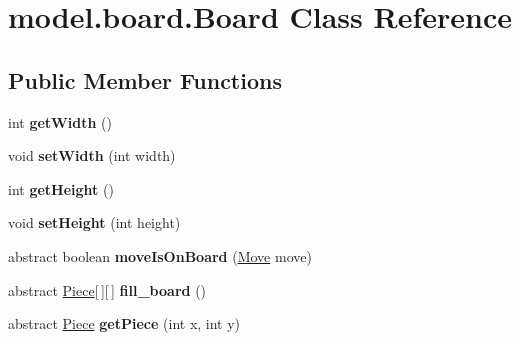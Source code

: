 \hypertarget{classmodel_1_1board_1_1_board}{\section{model.\-board.\-Board Class Reference}
\label{classmodel_1_1board_1_1_board}
}
\subsection*{Public Member Functions}
\begin{DoxyCompactItemize}
\item 
\hypertarget{classmodel_1_1board_1_1_board_ae49d2dd17586c9487302e3d072606011}{int {\bfseries get\-Width} ()}\label{classmodel_1_1board_1_1_board_ae49d2dd17586c9487302e3d072606011}

\item 
\hypertarget{classmodel_1_1board_1_1_board_ae74beaedbf44d6c618d917e0e8a16399}{void {\bfseries set\-Width} (int width)}\label{classmodel_1_1board_1_1_board_ae74beaedbf44d6c618d917e0e8a16399}

\item 
\hypertarget{classmodel_1_1board_1_1_board_a186f90661074eca42ab9bb9b60a168b6}{int {\bfseries get\-Height} ()}\label{classmodel_1_1board_1_1_board_a186f90661074eca42ab9bb9b60a168b6}

\item 
\hypertarget{classmodel_1_1board_1_1_board_ad0c3e3366862ed2c6698721180e1459c}{void {\bfseries set\-Height} (int height)}\label{classmodel_1_1board_1_1_board_ad0c3e3366862ed2c6698721180e1459c}

\item 
\hypertarget{classmodel_1_1board_1_1_board_a058a9e371a7a6dd3bdde2b8d7e112f1e}{abstract boolean {\bfseries move\-Is\-On\-Board} (\hyperlink{classmodel_1_1_move}{Move} move)}\label{classmodel_1_1board_1_1_board_a058a9e371a7a6dd3bdde2b8d7e112f1e}

\item 
\hypertarget{classmodel_1_1board_1_1_board_aed1e1dd7d6d069d6d11d4d6814861031}{abstract \hyperlink{classmodel_1_1piece_1_1_piece}{Piece}\mbox{[}$\,$\mbox{]}\mbox{[}$\,$\mbox{]} {\bfseries fill\-\_\-board} ()}\label{classmodel_1_1board_1_1_board_aed1e1dd7d6d069d6d11d4d6814861031}

\item 
\hypertarget{classmodel_1_1board_1_1_board_a99c41d693f7d98e0c19d36219b510cfa}{abstract \hyperlink{classmodel_1_1piece_1_1_piece}{Piece} {\bfseries get\-Piece} (int x, int y)}\label{classmodel_1_1board_1_1_board_a99c41d693f7d98e0c19d36219b510cfa}


\end{DoxyCompactItemize}
